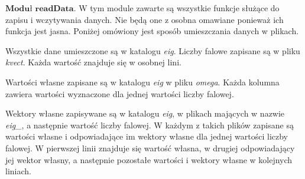 \vspace {3mm}
 \( \textbf{Moduł readData} \).
W tym module zawarte są wszystkie funkcje służące do zapisu i wczytywania danych. Nie będą one z osobna omawiane ponieważ ich funkcja jest jasna. Poniżej omówiony jest sposób umieszczania danych w plikach.

Wszystkie dane umieszczone są w katalogu \textit{eig}. Liczby falowe zapisane są w pliku \textit{kvect}. Każda wartość znajduje się w osobnej lini.

Wartości własne zapisane są w katalogu \textit{eig} w pliku \textit{omega}. Każda kolumna zawiera wartości wyznaczone dla jednej wartości liczby falowej.

Wektory własne zapisywane są w katalogu \textit{eig}, w plikach mających w nazwie \textit{eig\_}, a następnie wartość liczby falowej. W każdym z takich plików zapisane są wartości własne i odpowiadające im wektory własne dla jednej wartości liczby falowej. W pierwszej linii znajduje się wartość własna, w drugiej odpowiadający jej wektor własny, a następnie pozostałe wartości i wektory własne w kolejnych liniach.